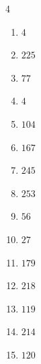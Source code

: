 \begin{multicols}{4}
\begin{enumerate}

  \item $4$


  \item $225$


\columnbreak %

  \item $77$


  \item $4$


  \item $104$


  \item $167$


  \item $245$


  \item $253$


  \item $56$


  \item $27$


  \item $179$


  \item $218$


  \item $119$


  \item $214$


  \item $120$



\end{enumerate}
\end{multicols}
